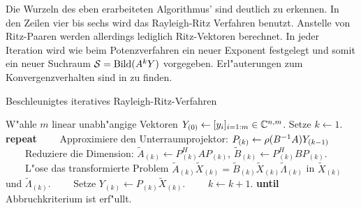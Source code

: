 Die Wurzeln des eben erarbeiteten Algorithmus' sind deutlich zu erkennen. In den Zeilen vier bis sechs wird das Rayleigh-Ritz Verfahren benutzt. Anstelle von Ritz-Paaren werden allerdings lediglich Ritz-Vektoren berechnet. In jeder Iteration wird wie beim Potenzverfahren ein neuer Exponent festgelegt und somit ein neuer Suchraum $\mathcal{S} = \operatorname{Bild}(A^k Y)$ vorgegeben. Erl"auterungen zum Konvergenzverhalten sind in \cite[Abschnitt 5]{saad} zu finden.





\begin{algorithm}
\caption{Beschleunigtes iteratives Rayleigh-Ritz-Verfahren}\label{alg:chap4:beschlRrIteration}
\begin{algorithmic}[1]
\State W"ahle $m$ linear unabh"angige Vektoren $Y_{(0)} \gets [y_i]_{i=1:m} \in\mathbb{C}^{n,m}$.
Setze $k \gets 1$.
\State \textbf{repeat}
\State \ \ \ \ Approximiere den Unterraumprojektor: $P_{(k)} \gets \rho(B^{-1}A)Y_{(k-1)}$
\State \ \ \ \ Reduziere die Dimension: $\widetilde{A}_{(k)} \gets P_{(k)}^H A P_{(k)}$,
$\widetilde{B}_{(k)} \gets P_{(k)}^H B P_{(k)}$.
\State \ \ \ \ L"ose das transformierte Problem $\widetilde{A}_{(k)}\widetilde{X}_{(k)}
= \widetilde{B}_{(k)}\widetilde{X}_{(k)}\widetilde{\Lambda}_{(k)}$ in
$\widetilde{X}_{(k)}$ und $\widetilde{\Lambda}_{(k)}$.
\State \ \ \ \ Setze $Y_{(k)} \gets P_{(k)}\widetilde{X}_{(k)}$.
\State \ \ \ \ $k \gets k+1$.
\State \textbf{until} Abbruchkriterium ist erf"ullt.
\end{algorithmic}
\end{algorithm}



